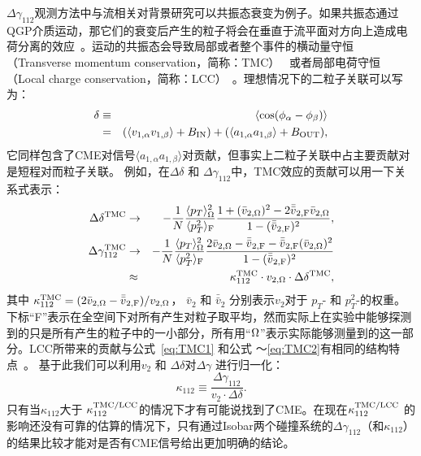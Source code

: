  $\Delta\gamma_{112}$观测方法中与流相关对背景研究可以共振态衰变为例子。如果共振态通过QGP介质运动，那它们的衰变后产生的粒子将会在垂直于流平面对方向上造成电荷分离的效应~\cite{fuqiang2010,Schlichting:2010qia}。运动的共振态会导致局部或者整个事件的横动量守恒（Transverse momentum conservation，简称：TMC）~\cite{Pratt:2010zn,Bzdak:2012ia} 或者局部电荷守恒（Local charge conservation，简称：LCC）~\cite{Schlichting:2010qia}。理想情况下的二粒子关联可以写为：
\begin{eqnarray}
\delta &\equiv& \langle \cos(\phi_\alpha -\phi_\beta) \rangle \nonumber \\
&=& (\langle v_{1,\alpha}v_{1,\beta}\rangle + B_{\rm IN}) +(\langle a_{1,\alpha}a_{1,\beta}\rangle + B_{\rm OUT}),
\label{eq:delta}
\end{eqnarray}
它同样包含了CME对信号$\langle a_{1,\alpha} a_{1,\beta} \rangle$对贡献，但事实上二粒子关联中占主要贡献对是短程对而粒子关联。
例如，在$\Delta \delta$ 和 $\Delta \gamma_{112}$中，TMC效应的贡献可以用一下关系式表示\cite{Bzdak:2012ia}：
\begin{eqnarray}
\Delta \delta^{\rm TMC} &\rightarrow& -\frac{1}{N}
\frac{\langle p_T \rangle^2_{\rm \Omega}}{\langle p_T^2 \rangle_{\rm F}}
\frac{1+({\bar v}_{2,{\rm \Omega}})^2-2{\bar{\bar v}}_{2,{\rm F}}{\bar v}_{2,{\rm \Omega}}} {1-({\bar{\bar v}}_{2,{\rm F}})^2},
\label{eq:TMC1}
\\
\Delta \gamma^{\rm TMC}_{112} &\rightarrow& -\frac{1}{N}
\frac{\langle p_T \rangle^2_{\rm \Omega}}{\langle p_T^2 \rangle_{\rm F}}
\frac{2{\bar v}_{2,{\rm \Omega}}-{\bar{\bar v}}_{2,{\rm F}}-{\bar{\bar v}}_{2,{\rm F}}({\bar v}_{2,{\rm \Omega}})^2} {1-({\bar{\bar v}}_{2,{\rm F}})^2}
\nonumber \\
&\approx& \kappa^{\rm TMC}_{112} \cdot v_{2,{\rm \Omega}} \cdot \Delta \delta^{\rm TMC},
\label{eq:TMC2}
\end{eqnarray}
其中 $\kappa^{\rm TMC}_{112} = (2{\bar v}_{2,{\rm \Omega}}-{\bar{\bar v}}_{2,{\rm F}})/v_{2,{\rm \Omega}}$， ${\bar v}_{2}$ 和 ${\bar{\bar v}}_{2}$ 分别表示$v_2$对于 $p_T$- 和 $p_T^2$-的权重。下标“F”表示在全空间下对所有产生对粒子取平均，然而实际上在实验中能够探测到的只是所有产生的粒子中的一小部分，所有用“${\rm \Omega}$”表示实际能够测量到的这一部分。LCC所带来的贡献与公式~\ref{eq:TMC1} 和公式 ～\ref{eq:TMC2}有相同的结构特点~\cite{Pratt:2010zn,Schlichting:2010qia}。
基于此我们可以利用$v_2$ 和 $\Delta \delta$对$\Delta \gamma$ 进行归一化：
\begin{equation}
    \kappa_{112} \equiv \frac{\Delta \gamma_{112}}{v_2 \cdot \Delta \delta}.
\label{kappa112}
\end{equation}
 只有当$\kappa_{112}$大于 $\kappa^{\rm TMC/LCC}_{112}$的情况下才有可能说找到了CME。在现在$\kappa^{\rm TMC/LCC}_{112}$ 的影响还没有可靠的估算的情况下，只有通过Isobar两个碰撞系统的$\Delta\gamma_{112}$（和$\kappa_{112}$）的结果比较才能对是否有CME信号给出更加明确的结论。 

